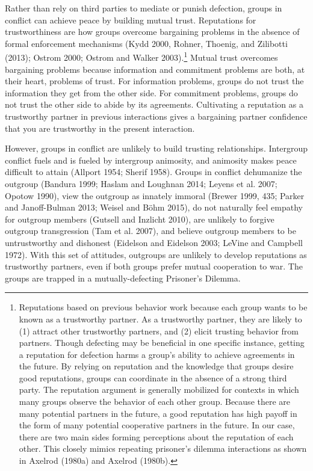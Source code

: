 \documentclass[11pt]{article}
\begin{document}
Rather than rely on third parties to mediate or punish defection, groups
in conflict can achieve peace by building mutual trust. Reputations for
trustworthiness are how groups overcome bargaining problems in the
absence of formal enforcement mechanisms (Kydd 2000, Rohner, Thoenig,
and Zilibotti (2013); Ostrom 2000; Ostrom and Walker 2003).\footnote{Reputations
  based on previous behavior work because each group wants to be known
  as a trustworthy partner. As a trustworthy partner, they are likely to
  (1) attract other trustworthy partners, and (2) elicit trusting
  behavior from partners. Though defecting may be beneficial in one
  specific instance, getting a reputation for defection harms a group's
  ability to achieve agreements in the future. By relying on reputation
  and the knowledge that groups desire good reputations, groups can
  coordinate in the absence of a strong third party. The reputation
  argument is generally mobilized for contexts in which many groups
  observe the behavior of each other group. Because there are many
  potential partners in the future, a good reputation has high payoff in
  the form of many potential cooperative partners in the future. In our
  case, there are two main sides forming perceptions about the
  reputation of each other. This closely mimics repeating prisoner's
  dilemma interactions as shown in Axelrod (1980a) and Axelrod (1980b).}
Mutual trust overcomes bargaining problems because information and
commitment problems are both, at their heart, problems of trust. For
information problems, groups do not trust the information they get from
the other side. For commitment problems, groups do not trust the other
side to abide by its agreements. Cultivating a reputation as a
trustworthy partner in previous interactions gives a bargaining partner
confidence that you are trustworthy in the present interaction.

However, groups in conflict are unlikely to build trusting
relationships. Intergroup conflict fuels and is fueled by intergroup
animosity, and animosity makes peace difficult to attain (Allport 1954;
Sherif 1958). Groups in conflict dehumanize the outgroup (Bandura 1999;
Haslam and Loughnan 2014; Leyens et al. 2007; Opotow 1990), view the
outgroup as innately immoral (Brewer 1999, 435; Parker and Janoff-Bulman
2013; Weisel and Böhm 2015), do not naturally feel empathy for outgroup
members (Gutsell and Inzlicht 2010), are unlikely to forgive outgroup
transgression (Tam et al. 2007), and believe outgroup members to be
untrustworthy and dishonest (Eidelson and Eidelson 2003; LeVine and
Campbell 1972). With this set of attitudes, outgroups are unlikely to
develop reputations as trustworthy partners, even if both groups prefer
mutual cooperation to war. The groups are trapped in a
mutually-defecting Prisoner's Dilemma.
\end{document}

